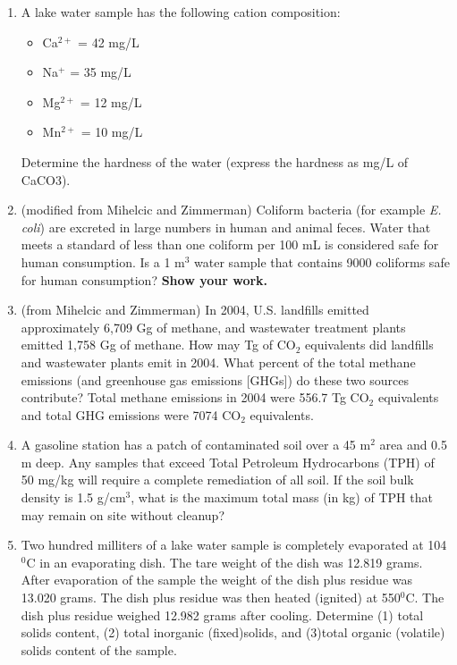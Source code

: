 \documentclass[12pt,letterpaper]{article}
\begin{document}
\begin{enumerate}
\item A lake water sample has the following cation composition:
\begin{itemize}
\item Ca$^{2+}$ = 42 mg/L
\item Na$^{+}$ = 35 mg/L
\item Mg$^{2+}$ = 12 mg/L
\item Mn$^{2+}$ = 10 mg/L
\end{itemize}
Determine the hardness of the water (express the hardness as mg/L of CaCO3).
 
\item (modified from Mihelcic and Zimmerman) Coliform bacteria (for example \emph{E. coli}) are excreted in large numbers in human and animal feces.  Water that meets a standard of less than one coliform per 100 mL is considered safe for human consumption.  Is a 1 m$^3$ water sample that contains 9000 coliforms safe for human consumption?  \textbf{Show your work.}


\item (from Mihelcic and Zimmerman) In 2004, U.S. landfills emitted approximately 6,709 Gg of methane, and wastewater treatment plants emitted 1,758 Gg of methane.  How may Tg  of CO$_2$ equivalents did landfills and wastewater plants emit in 2004.  What percent of the total methane emissions (and greenhouse gas emissions [GHGs]) do these two sources contribute? Total methane emissions in 2004 were 556.7 Tg CO$_2$ equivalents and total GHG emissions were 7074 CO$_2$ equivalents. 


\item A gasoline station has a patch of contaminated soil over a 45 m$^2$ area and 0.5 m deep. Any samples that exceed Total Petroleum Hydrocarbons (TPH) of 50 mg/kg will require a complete remediation of all soil. If the soil bulk density is 1.5 g/cm$^3$, what is the maximum total mass (in kg) of TPH that may remain on site without cleanup?

\item Two hundred milliters of a lake water sample is completely evaporated at 104$^0$C in an evaporating dish.  The tare weight of the dish was 12.819 grams.  After evaporation of the sample the weight of the dish plus residue was 13.020 grams.  The dish plus residue was then heated (ignited) at 550$^0$C.  The dish plus residue weighed 12.982 grams after cooling.  Determine (1) total solids content, (2) total inorganic (fixed)solids, and (3)total organic (volatile) solids content of the sample. 


\end{enumerate}
\end{document}
